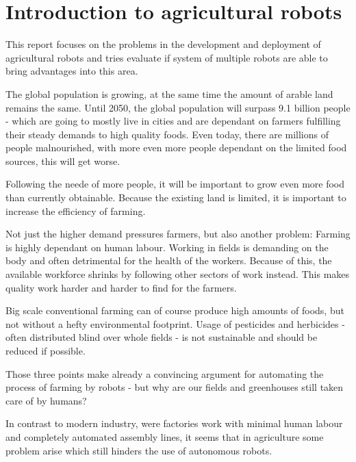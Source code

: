\newcommand*\rot{\rotatebox{90}}

    \chapter{Introduction to agricultural robots}

    This report focuses on the problems in the development and deployment of agricultural robots and tries evaluate if system of multiple robots are able to bring advantages into this area.

    The global population is growing, at the same time the amount of arable land remains the same. Until 2050, the global population will surpass 9.1 billion people - which are going to mostly live in cities and are dependant on farmers fulfilling their steady demands to high quality foods. Even today, there are millions of people malnourished, with more even more people dependant on the limited food sources, this will get worse. \cite{FAO2021}
    
    Following the neede of more people, it will be important to grow even more food than currently obtainable. Because the existing land is limited, it is important to increase the efficiency of farming. 

    Not just the higher demand pressures farmers, but also another problem: Farming is highly dependant on human labour. Working in fields is demanding on the body and often detrimental for the health of the workers. Because of this, the available workforce shrinks by following other sectors of work instead. This makes quality work harder and harder to find for the farmers. \cite{Vasconez2019}

    Big scale conventional farming can of course produce high amounts of foods, but not without a hefty environmental footprint. Usage of pesticides and herbicides - often distributed blind over whole fields - is not sustainable and should be reduced if possible. \cite{ConesaMunoz2015}

    Those three points make already a convincing argument for automating the process of farming by robots - but why are our fields and greenhouses still taken care of by humans? 

    In contrast to modern industry, were factories work with minimal human labour and completely automated assembly lines, it seems that in agriculture some problem arise which still hinders the use of autonomous robots. 

